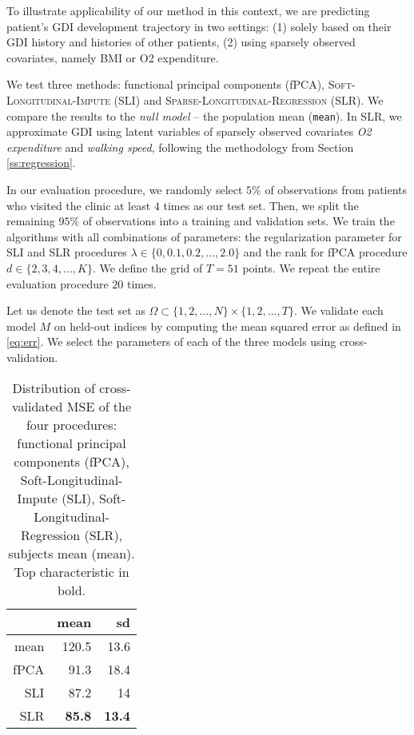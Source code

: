 \documentclass[preprint]{imsart}
\numberwithin{equation}{section}
\theoremstyle{plain}
\begin{document}
To illustrate applicability of our method in this context, we are predicting patient's GDI development trajectory in two settings: (1) solely based on their GDI history and histories of other patients, (2) using sparsely observed covariates, namely BMI or O2 expenditure. 

We test three methods: functional principal components (fPCA), \textsc{Soft-Longitudinal-Impute} (SLI) and \textsc{Sparse-Longitudinal-Regression} (SLR). We compare the results to the \emph{null model} -- the population mean (\verb|mean|). In SLR, we approximate GDI using latent variables of sparsely observed covariates \textit{O2 expenditure} and \textit{walking speed}, following the methodology from Section \ref{ss:regression}.

In our evaluation procedure, we randomly select $5\%$ of observations from patients who visited the clinic at least $4$ times as our test set. Then, we split the remaining $95\%$ of observations into a training and validation sets. We train the algorithms with all combinations of parameters: the regularization parameter for SLI and SLR procedures $\lambda \in \{0, 0.1, 0.2, ..., 2.0\}$ and the rank for fPCA procedure $d \in \{2,3,4,...,K\}$. We define the grid of $T = 51$ points. We repeat the entire evaluation procedure $20$ times.

Let us denote the test set as $\Omega \subset \{1,2,...,N\} \times \{1,2,...,T\}$. We validate each model $M$ on held-out indices by computing the mean squared error as defined in \eqref{eq:err}. We select the parameters of each of the three models using cross-validation. %

\begin{table}[ht]
  \centering
\begin{tabular}{rrr}
  \hline
 & mean & sd \\ 
  \hline
  mean & 120.5 & 13.6\\
  fPCA & 91.3 & 18.4\\
  SLI & 87.2 & 14\\
  SLR & \textbf{85.8} & \textbf{13.4} \\
   \hline
\end{tabular}\label{tbl:data-res}
\caption{Distribution of cross-validated MSE of the four procedures: functional principal components (fPCA), Soft-Longitudinal-Impute (SLI), Soft-Longitudinal-Regression (SLR), subjects mean (mean). Top characteristic in bold.}
\end{table}
\end{document}
